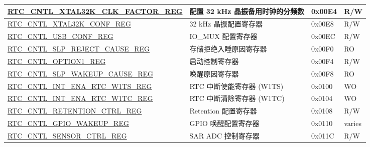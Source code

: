 \begin{longtable}{ | l | l | p{1.3cm} | p{1cm} | }
\hyperref[regdesc:RTCCNTLXTAL32KCLKFACTORREG]{RTC\_CNTL\_XTAL32K\_CLK\_FACTOR\_REG} & 配置 32 kHz 晶振备用时钟的分频数 & 0x00E4 & R/W \\ \hline
\hyperref[regdesc:RTCCNTLXTAL32KCONFREG]{RTC\_CNTL\_XTAL32K\_CONF\_REG} & 32 kHz 晶振配置寄存器 & 0x00E8 & R/W \\ \hline
\hyperref[regdesc:RTCCNTLUSBCONFREG]{RTC\_CNTL\_USB\_CONF\_REG} & IO\_MUX 配置寄存器 & 0x00EC & R/W \\ \hline
\hyperref[regdesc:RTCCNTLSLPREJECTCAUSEREG]{RTC\_CNTL\_SLP\_REJECT\_CAUSE\_REG} & 存储拒绝入睡原因寄存器 & 0x00F0 & RO \\ \hline
\hyperref[regdesc:RTCCNTLOPTION1REG]{RTC\_CNTL\_OPTION1\_REG} & 启动控制寄存器 & 0x00F4 & R/W \\ \hline
\hyperref[regdesc:RTCCNTLSLPWAKEUPCAUSEREG]{RTC\_CNTL\_SLP\_WAKEUP\_CAUSE\_REG} & 唤醒原因寄存器 & 0x00F8 & RO \\ \hline
\hyperref[regdesc:RTCCNTLINTENARTCW1TSREG]{RTC\_CNTL\_INT\_ENA\_RTC\_W1TS\_REG} & RTC 中断使能寄存器 (W1TS) & 0x0100 & WO \\ \hline
\hyperref[regdesc:RTCCNTLINTENARTCW1TCREG]{RTC\_CNTL\_INT\_ENA\_RTC\_W1TC\_REG} & RTC 中断清除寄存器 (W1TC) & 0x0104 & WO \\ \hline
\hyperref[regdesc:RTCCNTLRETENTIONCTRLREG]{RTC\_CNTL\_RETENTION\_CTRL\_REG} & Retention 配置寄存器 & 0x0108 & R/W \\ \hline
\hyperref[regdesc:RTCCNTLGPIOWAKEUPREG]{RTC\_CNTL\_GPIO\_WAKEUP\_REG} & GPIO 唤醒配置寄存器 & 0x0110 & varies \\ \hline
\hyperref[regdesc:RTCCNTLSENSORCTRLREG]{RTC\_CNTL\_SENSOR\_CTRL\_REG} & SAR ADC 控制寄存器 & 0x011C & R/W \\ \hline
\end{longtable}
